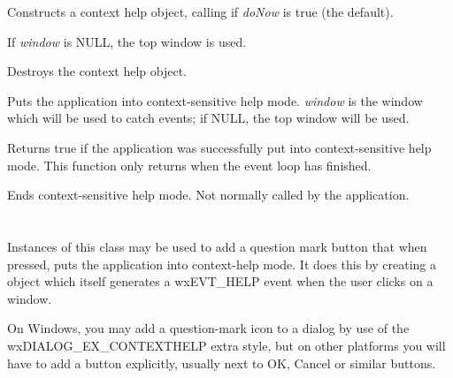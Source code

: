 Constructs a context help object, calling  if\rtfsp
{\it doNow} is true (the default).

If {\it window} is NULL, the top window is used.

\label{wxcontexthelpdtor}


Destroys the context help object.

\label{wxcontexthelpbegincontexthelp}


Puts the application into context-sensitive help mode. {\it window} is the window
which will be used to catch events; if NULL, the top window will be used.

Returns true if the application was successfully put into context-sensitive help mode.
This function only returns when the event loop has finished.

\label{wxcontexthelpendcontexthelp}


Ends context-sensitive help mode. Not normally called by the application.

\section{}\label{wxcontexthelpbutton}

Instances of this class may be used to add a question mark button that when pressed, puts the
application into context-help mode. It does this by creating a  object which itself
generates a wxEVT\_HELP event when the user clicks on a window.

On Windows, you may add a question-mark icon to a dialog by use of the wxDIALOG\_EX\_CONTEXTHELP extra style, but
on other platforms you will have to add a button explicitly, usually next to OK, Cancel or similar buttons.


\\
\\
\\
\\
\\

